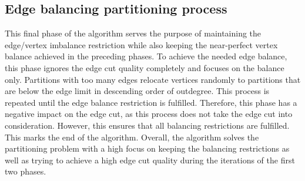 \documentclass[acmsmall,nonacm,screen,review]{acmart}
\begin{document}
\subsection{Edge balancing partitioning process}
This final phase of the algorithm serves the purpose of maintaining the edge/vertex imbalance restriction while also keeping the near-perfect vertex balance achieved in the preceding phases. To achieve the needed edge balance, this phase ignores the edge cut quality completely and focuses on the balance only. Partitions with too many edges relocate vertices randomly to partitions that are below the edge limit in descending order of outdegree. This process is repeated until the edge balance restriction is fulfilled. Therefore, this phase has a negative impact on the edge cut, as this process does not take the edge cut into consideration. However, this ensures that all balancing restrictions are fulfilled. This marks the end of the algorithm. Overall, the algorithm solves the partitioning problem with a high focus on keeping the balancing restrictions as well as trying to achieve a high edge cut quality during the iterations of the first two phases.
\end{document}
